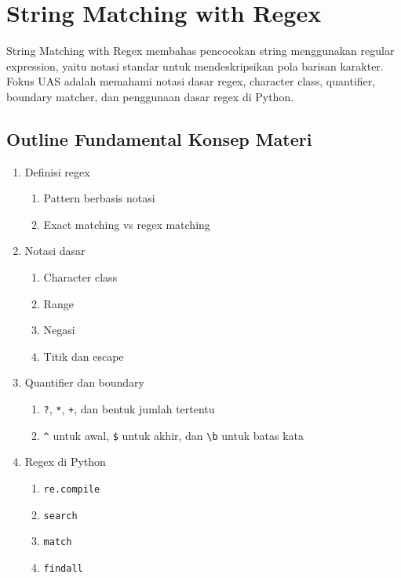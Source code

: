 \section{String Matching with Regex}

String Matching with Regex membahas pencocokan string menggunakan regular expression, yaitu notasi standar untuk mendeskripsikan pola barisan karakter. Fokus UAS adalah memahami notasi dasar regex, character class, quantifier, boundary matcher, dan penggunaan dasar regex di Python.

\subsection{Outline Fundamental Konsep Materi}
\begin{enumerate}
    \item Definisi regex
    \begin{enumerate}
        \item Pattern berbasis notasi
        \item Exact matching vs regex matching
    \end{enumerate}
    \item Notasi dasar
    \begin{enumerate}
        \item Character class
        \item Range
        \item Negasi
        \item Titik dan escape
    \end{enumerate}
    \item Quantifier dan boundary
    \begin{enumerate}
        \item \texttt{?}, \texttt{*}, \texttt{+}, dan bentuk jumlah tertentu
        \item \texttt{\^{}} untuk awal, \texttt{\$} untuk akhir, dan \texttt{\textbackslash b} untuk batas kata
    \end{enumerate}
    \item Regex di Python
    \begin{enumerate}
        \item \texttt{re.compile}
        \item \texttt{search}
        \item \texttt{match}
        \item \texttt{findall}
    \end{enumerate}
\end{enumerate}

